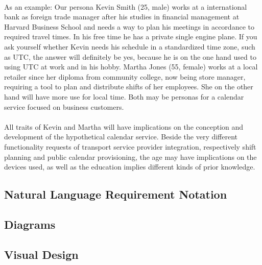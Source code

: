 \paragraph{} As an example: Our persona Kevin Smith (25, male) works at a international bank as foreign trade manager after his studies in financial management at Harvard Business School and needs a way to plan his meetings in accordance to required travel times. In his free time he has a private single engine plane. If you ask yourself whether Kevin needs his schedule in a standardized time zone, such as UTC, the answer will definitely be yes, because he is on the one hand used to using UTC at work and in his hobby. Martha Jones (55, female) works at a local retailer since her diploma from community college, now being store manager, requiring a tool to plan and distribute shifts of her employees. She on the other hand will have more use for local time. Both may be personas for a calendar service focused on business customers. 
\paragraph{} All traits of Kevin and Martha will have implications on the conception and development of the hypothetical calendar service. Beside the very different functionality requests of transport service provider integration, respectively shift planning and public calendar provisioning, the age may have implications on the devices used, as well as the education implies different kinds of prior knowledge. 
\subsection{Natural Language Requirement Notation}
\subsection{Diagrams}
\subsection{Visual Design}